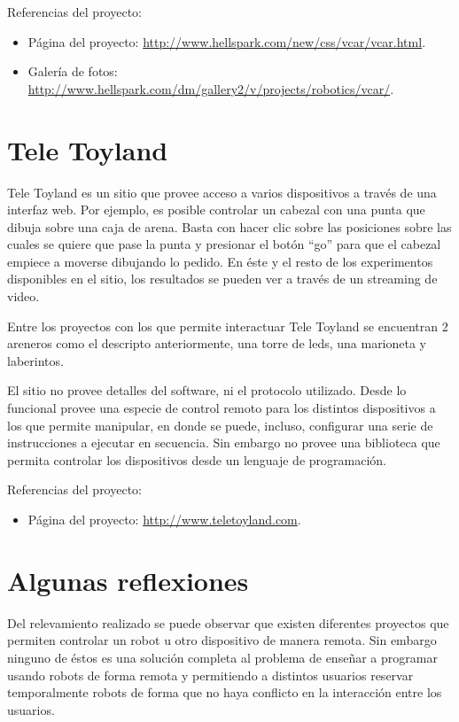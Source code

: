 Referencias del proyecto:
\begin{itemize}
    \item Página del proyecto: \url{http://www.hellspark.com/new/css/vcar/vcar.html}.
    \item Galería de fotos: \url{http://www.hellspark.com/dm/gallery2/v/projects/robotics/vcar/}.
\end{itemize}


\section{Tele Toyland}

Tele Toyland es un sitio que provee acceso a varios dispositivos a través de una interfaz
web. Por ejemplo, es posible controlar un cabezal con una punta que dibuja sobre
una caja de arena. Basta con hacer clic sobre las posiciones sobre las cuales
se quiere que pase la punta y presionar el botón ``go'' para que el cabezal
empiece a moverse dibujando lo pedido. En éste y el resto de los experimentos
disponibles en el sitio, los resultados se pueden ver a través de un streaming
de video.

Entre los proyectos con los que permite interactuar Tele Toyland
se encuentran  2 areneros como el descripto
anteriormente, una torre de leds, una marioneta y laberintos.

El sitio no provee detalles del software, ni el protocolo utilizado. Desde
lo funcional
provee una especie de control remoto para los distintos dispositivos a los
que permite
manipular, en donde se puede, incluso, configurar una serie de instrucciones a ejecutar
en secuencia. Sin embargo no provee una biblioteca que permita controlar
los dispositivos desde un lenguaje de programación.

Referencias del proyecto:
\begin{itemize}
    \item Página del proyecto: \url{http://www.teletoyland.com}.
\end{itemize}


\section{Algunas reflexiones}

Del relevamiento realizado se puede observar que existen diferentes
proyectos que permiten controlar un robot u otro dispositivo de
manera remota. Sin embargo ninguno de éstos es una solución completa
al problema de
enseñar a programar usando robots de forma remota y permitiendo a distintos
usuarios reservar temporalmente robots de forma que no haya conflicto en la
interacción entre los usuarios.

